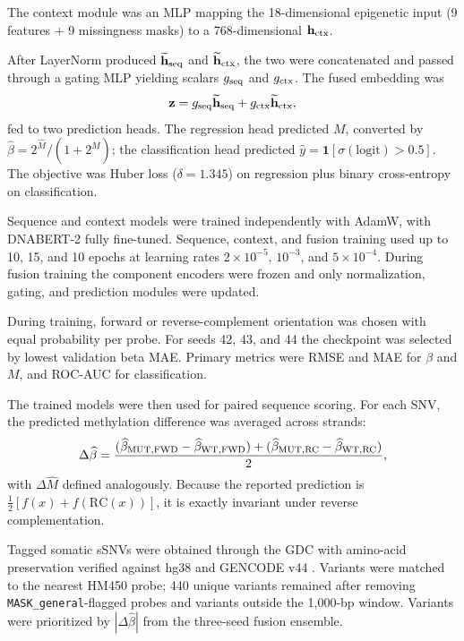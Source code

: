 \documentclass[10pt,letterpaper,twocolumn]{article}
\begin{document}
The context module was an MLP mapping the 18-dimensional epigenetic input
(9 features $+$ 9 missingness masks) to a 768-dimensional
$\mathbf h_{\rm ctx}$.

After LayerNorm produced $\widetilde{\mathbf h}_{\rm seq}$ and
$\widetilde{\mathbf h}_{\rm ctx}$, the two were concatenated and passed through a
gating MLP yielding scalars $g_{\rm seq}$ and $g_{\rm ctx}$. The fused embedding
was
\[
\mathbf z=g_{\rm seq}\widetilde{\mathbf h}_{\rm seq}
          +g_{\rm ctx}\widetilde{\mathbf h}_{\rm ctx},
\]
fed to two prediction heads. The regression head predicted $M$, converted by
$\widehat\beta=2^{\widehat M}/(1+2^{\widehat M})$; the classification head
predicted $\widehat{y}=\mathbf 1[\sigma(\text{logit})>0.5]$. The objective was
Huber loss ($\delta=1.345$) on regression plus binary cross-entropy on
classification.

Sequence and context models were trained independently with AdamW, with DNABERT-2
fully fine-tuned. Sequence, context, and fusion training used up to 10, 15, and 10
epochs at learning rates $2\times10^{-5}$, $10^{-3}$, and $5\times10^{-4}$.
During fusion training the component encoders were frozen and only normalization,
gating, and prediction modules were updated.

During training, forward or reverse-complement orientation was chosen with equal
probability per probe. For seeds 42, 43, and 44 the checkpoint was selected by
lowest validation beta MAE. Primary metrics were RMSE and MAE for $\beta$ and
$M$, and ROC-AUC for classification.

The trained models were then used for paired sequence scoring. For each SNV,
the predicted methylation difference was averaged across strands:
\[
\Delta\widehat\beta=
\frac{(\widehat\beta_{\rm MUT, FWD}-\widehat\beta_{\rm WT, FWD})+
(\widehat\beta_{\rm MUT, RC}-\widehat\beta_{\rm WT, RC})}{2},
\]
with $\Delta\widehat M$ defined analogously. Because the reported prediction is
$\tfrac12[f(x)+f(\mathrm{RC}(x))]$, it is exactly invariant under reverse
complementation.

Tagged somatic sSNVs were obtained through the GDC with amino-acid preservation
verified against hg38 and GENCODE
v44 \cite{grossman2016gdc,frankish2021gencode}. Variants were matched to the
nearest HM450 probe; 440 unique variants remained after removing
\texttt{MASK\_general}-flagged probes and variants outside the 1{,}000-bp window.
Variants were prioritized by $|\Delta\widehat\beta|$ from the three-seed fusion
ensemble.
\end{document}
